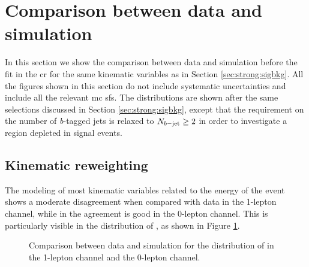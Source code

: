
%
\section{Comparison between data and simulation}
\label{sec:strong:dataMC}
In this section we show the comparison between data and simulation before the fit in the \gls{cr}
for the same kinematic variables as in Section \ref{sec:strong:sigbkg}. 
All the figures shown in this section do not include systematic uncertainties and include all the relevant \gls{mc} \glspl{sf}. 
The distributions are shown after the same selections discussed in Section \ref{sec:strong:sigbkg}, 
except that the requirement on the number
of \textit{b}-tagged jets is relaxed to $N_{b\mathrm{-jet}} \geq 2$ 
in order to investigate a region depleted in signal events. 

\subsection{Kinematic reweighting}
\label{sec:strong:kinrw}

The modeling of most kinematic variables related to the energy of the event shows a moderate disagreement 
when compared with data in the 1-lepton channel, while in the agreement is good in the 0-lepton channel. 
This is particularly visible in the distribution of \meff, as shown in Figure \ref{fig:strong:datamc:meff_prerw}.

\begin{figure}[h]
\centering 
{}
\caption{Comparison between data and simulation for the distribution of \meff in  the 1-lepton channel and 
the 0-lepton channel.
}
\label{fig:strong:datamc:meff_prerw}
\end{figure}

